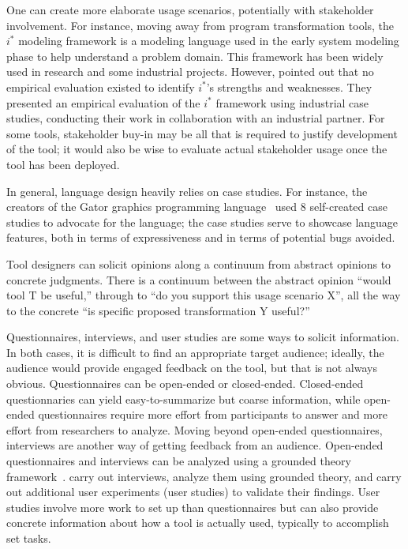One can create more elaborate usage scenarios, potentially
with stakeholder involvement.
For instance, moving away from program transformation tools, the $i^*$ modeling framework is a modeling language used in the early
system modeling phase to help understand a problem domain. This
framework has been widely used in research and some industrial
projects. However,  pointed out that no
empirical evaluation existed to identify $i^*$'s strengths and
weaknesses. They presented an empirical evaluation of the $i^*$
framework using industrial case studies, conducting their work in
collaboration with an industrial partner. 
For some tools, stakeholder buy-in may be all that is required
to justify development of the tool; it would also be wise to
evaluate actual stakeholder usage once the tool has been deployed.

In general, language design heavily relies on case studies.
For instance, the creators of the Gator graphics programming language~\cite{geisler20:_geomet_types_graph_progr} used 8 self-created case studies to advocate for the language; the case studies serve to showcase language features, both in terms of expressiveness and in terms of potential bugs avoided.

Tool designers can solicit opinions along a continuum from abstract
opinions to concrete judgments. There is a continuum between the
abstract opinion ``would tool T be useful,'' through to ``do you
support this usage scenario X'', all the way to the concrete ``is
specific proposed transformation Y useful?''

Questionnaires, interviews, and user studies are some ways to solicit
information. In both cases, it is difficult to find an appropriate
target audience; ideally, the audience would provide engaged feedback
on the tool, but that is not always obvious.  Questionnaires can be
open-ended or closed-ended. Closed-ended questionnaries can yield
easy-to-summarize but coarse information, while open-ended
questionnaires require more effort from participants to answer and
more effort from researchers to analyze. Moving beyond open-ended
questionnaires, interviews are another way of getting feedback
from an audience. Open-ended questionnaires and interviews can be 
analyzed using a grounded theory framework~\cite{glaser67:_discov_groun_theor}.
 carry out interviews, analyze them using grounded
theory, and carry out additional user experiments (user studies)
to validate their findings.
User studies involve more work to set up than questionnaires but can also provide concrete
information about how a tool is actually used, typically to accomplish set tasks.

